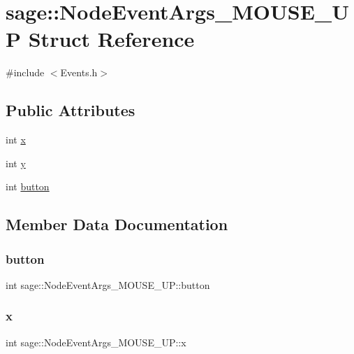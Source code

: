 \hypertarget{structsage_1_1NodeEventArgs__MOUSE__UP}{}\section{sage\+::Node\+Event\+Args\+\_\+\+M\+O\+U\+S\+E\+\_\+\+UP Struct Reference}
\label{structsage_1_1NodeEventArgs__MOUSE__UP}


{\ttfamily \#include $<$Events.\+h$>$}

\subsection*{Public Attributes}
\begin{DoxyCompactItemize}
\item 
int \mbox{\hyperlink{structsage_1_1NodeEventArgs__MOUSE__UP_a243541499a05bd61df96f3ac6abe0868}{x}}
\item 
int \mbox{\hyperlink{structsage_1_1NodeEventArgs__MOUSE__UP_ae88d867152a43ee7546de5a84b27da0b}{y}}
\item 
int \mbox{\hyperlink{structsage_1_1NodeEventArgs__MOUSE__UP_a94f83ed1cb32e3b4405ef3d70c1e85a0}{button}}
\end{DoxyCompactItemize}


\subsection{Member Data Documentation}
\mbox{\label{structsage_1_1NodeEventArgs__MOUSE__UP_a94f83ed1cb32e3b4405ef3d70c1e85a0}} 
\subsubsection{\texorpdfstring{button}{button}}
{\footnotesize\ttfamily int sage\+::\+Node\+Event\+Args\+\_\+\+M\+O\+U\+S\+E\+\_\+\+U\+P\+::button}

\mbox{\label{structsage_1_1NodeEventArgs__MOUSE__UP_a243541499a05bd61df96f3ac6abe0868}} 
\subsubsection{\texorpdfstring{x}{x}}
{\footnotesize\ttfamily int sage\+::\+Node\+Event\+Args\+\_\+\+M\+O\+U\+S\+E\+\_\+\+U\+P\+::x}

